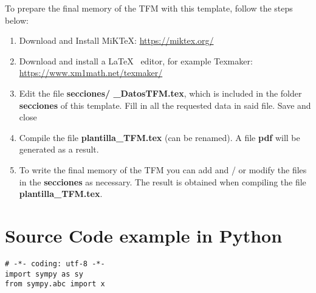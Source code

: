\vspace*{1.5cm}
To prepare the final memory of the TFM with this template, follow the steps below:
\begin{enumerate}
\item Download and Install MiKTeX:  \url{https://miktex.org/}
\item Download and install a \LaTeX~ editor, for example Texmaker:\\
\url{https://www.xm1math.net/texmaker/}

\item Edit the file \textbf{secciones/ \_DatosTFM.tex}, which is included in the folder \textbf{secciones} of this template. Fill in all the requested data in said file. Save and close
\item Compile the file
 \textbf{plantilla\_TFM.tex} (can be renamed). A file \textbf{pdf} will be generated as a result.
\item To write the final memory of the TFM you can add and / or modify the files in the \textbf{secciones} as necessary. The result is obtained when compiling the file \textbf{plantilla\_TFM.tex}. 
\end{enumerate}


\section{Source Code example in Python}
\begin{lstlisting}[style=Python]
# -*- coding: utf-8 -*-
import sympy as sy
from sympy.abc import x
\end{lstlisting}
